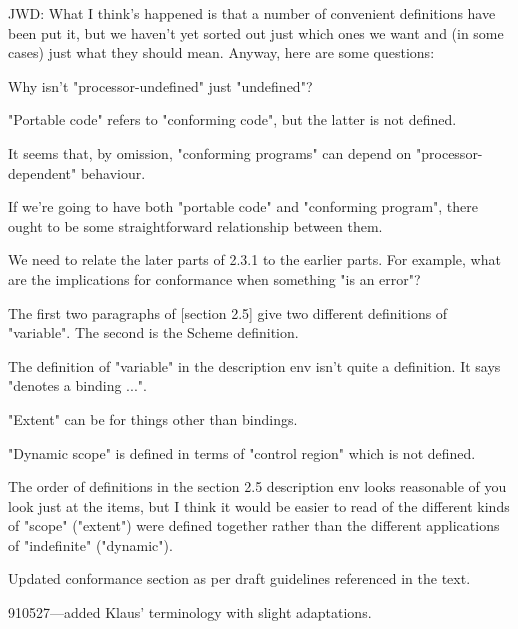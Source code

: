 \begin{optPrivate}
    JWD: What I think's happened is that a number of convenient definitions have
    been put it, but we haven't yet sorted out just which ones we want and (in
    some cases) just what they should mean.  Anyway, here are some questions:

    Why isn't "processor-undefined" just "undefined"?

    "Portable code" refers to "conforming code", but the latter is not defined.

    It seems that, by omission, "conforming programs" can depend on
    "processor-dependent" behaviour.

    If we're going to have both "portable code" and "conforming program", there
    ought to be some straightforward relationship between them.

    We need to relate the later parts of 2.3.1 to the earlier parts.  For
    example, what are the implications for conformance when something "is an
    error"?

    The first two paragraphs of [section 2.5] give two different definitions of
    "variable".  The second is the Scheme definition.

    The definition of "variable" in the description env isn't quite a
    definition.  It says "denotes a binding ...".

    "Extent" can be for things other than bindings.

    "Dynamic scope" is defined in terms of "control region" which is not
    defined.

    The order of definitions in the section 2.5 description env looks reasonable
    of you look just at the items, but I think it would be easier to read of the
    different kinds of "scope" ("extent") were defined together rather than the
    different applications of "indefinite" ("dynamic").

    Updated conformance section as per draft guidelines referenced in the text.

    910527---added Klaus' terminology with slight adaptations.
\end{optPrivate}
%
